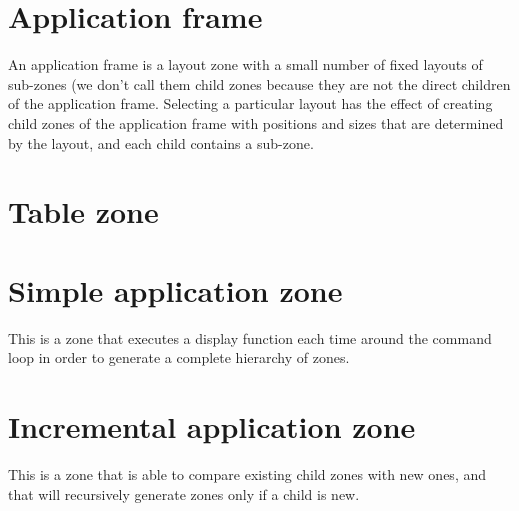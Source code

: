 



\section{Application frame}

An application frame is a layout zone with a small number of fixed
layouts of sub-zones (we don't call them child zones because they
are not the direct children of the application frame.  Selecting a
particular layout has the effect of creating child zones of the
application frame with positions and sizes that are determined by the
layout, and each child contains a sub-zone.

\section{Table zone}

\section{Simple application zone}

This is a zone that executes a display function each time around the
command loop in order to generate a complete hierarchy of zones.

\section{Incremental application zone}

This is a zone that is able to compare existing child zones with
new ones, and that will recursively generate zones only if a child
is new. 

